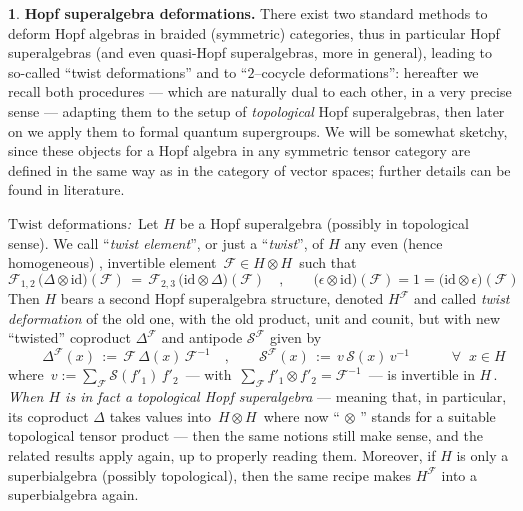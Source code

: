 \documentclass[12pt,reqno,twoside,a4paper]{amsart}
\numberwithin{equation}{section}
\theoremstyle{definition}
\newtheorem{free text}[lema]{}
\theoremstyle{remark}
\newcommand{\F}{{\mathcal F}}
\def \SS {\mathcal{S}}
\theoremstyle{plain}
\begin{document}
\vskip11pt

\begin{free text}  \label{defs_Hopf-algs}
%
 {\bf Hopf superalgebra deformations.}
%
 There exist two standard methods to deform Hopf algebras in braided (symmetric) categories,
 thus in particular Hopf superalgebras
 (and even quasi-Hopf superalgebras, more in general),
 leading to so-called ``twist deformations'' and to  ``$ 2 $--cocycle
 deformations'': hereafter we recall both procedures   --- which are naturally
   dual to each other,
%
%
 in a very precise sense ---   adapting them to the setup of  \textsl{topological\/}
 Hopf superalgebras, then later on we apply them to formal quantum supergroups.
 We will be somewhat sketchy, since these objects for a Hopf algebra in any symmetric tensor category are defined in the same way as in the category of vector spaces; further details can be found in literature.

\vskip11pt

 \textsl{$ \underline{\text{Twist deformations}} $:}\,
%
 Let  $ H $  be a Hopf superalgebra (possibly in topological sense).  We call
 ``{\it twist element}'',  or just a  ``{\it twist}'',  of  $ H $  any even (hence homogeneous) , invertible element  $ \, \F \in H \otimes H \, $  such that
%
  $$  \F_{1,2} \, \big( \Delta \otimes \text{id} \big)(\F)  \, =
  \,  \F_{2,3} \, \big( \text{id} \otimes \Delta \big)(\F)  \quad ,
  \qquad  \big( \epsilon \otimes \text{id} \big)(\F)  =  1
  =  \big( \text{id} \otimes \epsilon \big)(\F)  $$
%
 Then  $ H $  bears a second Hopf superalgebra structure, denoted  $ H^\F $
 and called  \textit{twist deformation\/}  of the old one, with the old product,
 unit and counit, but with new ``twisted'' coproduct  $ \Delta^\F $ and antipode
 $ \SS^\F $  given by
%
  $$  \qquad   \Delta^{\!\F}(x)  \, := \,  \F \, \Delta(x) \, \F^{-1}  \quad ,
    \qquad  \SS^\F(x) \, := \, v\,\SS(x)\,v^{-1}
    \quad \qquad  \forall \;\; x \in H  $$
%
 where  $ \, v := \sum_\F \SS(f'_1)\,f'_2 \, $   --- with
 $ \, \sum_\F f'_1 \otimes f'_2 = \F^{-1} \, $  ---
 is invertible in  $ H \, $.
  \textsl{When  $ H $  is in fact a  \textit{topological}  Hopf superalgebra}
  --- meaning that, in particular, its coproduct  $ \Delta $
 takes values into  $ \, H \otimes H \, $  where now  ``$ \, \otimes \, $''
 stands for a suitable topological tensor product ---
 then the same notions still make sense, and the related results apply again,
 up to properly reading them.  Moreover, if  $ H $  is only a superbialgebra
 (possibly topological), then the same recipe makes  $ H^\F $
 into a superbialgebra again.


\end{free text}
\end{document}
